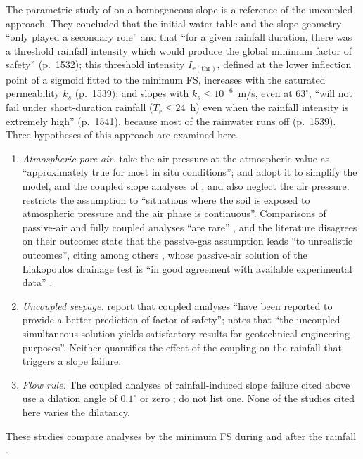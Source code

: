 \documentclass[preprint,12pt,authoryear]{elsarticle}
\begin{document}
The parametric study of \citet{rahardjo2007} on a homogeneous slope is a reference of the uncoupled approach. They
concluded that the initial water table and the slope geometry ``only played a secondary role'' and that ``for a given
rainfall duration, there was a threshold rainfall intensity which would produce the global minimum factor of safety''
(p.~1532); this threshold intensity $I_{r(\mathrm{thr})}$, defined at the lower inflection point of a sigmoid fitted
to the minimum FS, increases with the saturated permeability $k_s$ (p.~1539); and slopes with $k_s\le10^{-6}$~m/s,
even at $63^\circ$, ``will not fail under short-duration rainfall ($T_r\le24$~h) even when the rainfall intensity is
extremely high'' (p.~1541), because most of the rainwater runs off (p.~1539). Three hypotheses of this approach are
examined here.
\begin{enumerate}
\item \emph{Atmospheric pore air.} \citet[p.~811]{sheng2008} take the air pressure at the atmospheric value as
``approximately true for most in situ conditions''; \citet[p.~136]{li1999} and \citet[p.~792]{pedroso2015} adopt it to
simplify the model, and the coupled slope analyses of \citet[p.~3]{wang2018mpm}, \citet[p.~4]{liu2021} and
\citet[p.~4]{pradhan2022} also neglect the air pressure. \citet[p.~292]{fredlund2006} restricts the assumption to
``situations where the soil is exposed to atmospheric pressure and the air phase is continuous''. Comparisons of
passive-air and fully coupled analyses ``are rare'' \citep[p.~4]{ghorbani2018}, and the literature disagrees on
their outcome: \citet[p.~2]{khoei2021} state that the passive-gas assumption leads ``to unrealistic outcomes'',
citing among others \citet{callari2009}, whose passive-air solution of the Liakopoulos drainage test is ``in good
agreement with available experimental data'' \citep[p.~491]{callari2009}.
\item \emph{Uncoupled seepage.} \citet[p.~2]{pradhan2022} report that coupled analyses ``have been reported to provide
a better prediction of factor of safety''; \citet[p.~315]{fredlund2006} notes that ``the uncoupled simultaneous
solution yields satisfactory results for geotechnical engineering purposes''. Neither
quantifies the effect of the coupling on the rainfall that triggers a slope failure.
\item \emph{Flow rule.} The coupled analyses of rainfall-induced slope failure cited above use a dilation angle of
$0.1^\circ$ \citep[p.~6]{wang2018mpm} or zero \citep[p.~5]{liu2021}; \citet[Table~2]{pradhan2022} do not list one.
None of the studies cited here varies the dilatancy.
\end{enumerate}
These studies compare analyses by the minimum FS during and after the rainfall \citep[e.g.][p.~324]{tang2018}.
\end{document}
